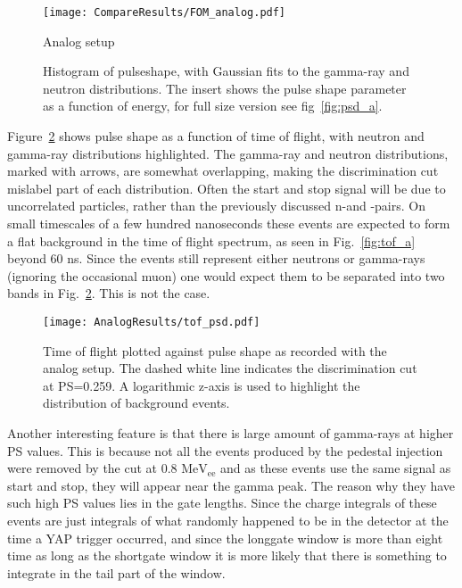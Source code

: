 \documentclass[main.tex]{subfiles}
\begin{document}



\begin{figure}[h!]
	    \centering
    	    \texttt{[image: CompareResults/FOM\_analog.pdf]}
        	\caption{Analog setup}
	    \label{fig:fom_analog} 
    \caption[Histograms of PS, with Gaussian fits for the analog setup.]{Histogram of pulseshape, with Gaussian fits to the gamma-ray and neutron distributions. The insert shows the pulse shape parameter as a function of energy, for full size version see fig~\ref{fig:psd_a}.}
\end{figure}

Figure~\ref{fig:tof_ps_a} shows pulse shape as a function of time of flight, with neutron and gamma-ray distributions highlighted. The gamma-ray and neutron distributions, marked with arrows, are somewhat overlapping, making the discrimination cut mislabel part of each distribution. Often the start and stop signal will be due to uncorrelated particles, rather than the previously discussed n-\textgamma and \textgamma-\textgamma pairs. On small timescales of a few hundred nanoseconds these events are expected to form a flat background in the time of flight spectrum, as seen in Fig.~\ref{fig:tof_a} beyond 60 ns. Since the events still represent either neutrons or gamma-rays (ignoring the occasional muon) one would expect them to be separated into two bands in Fig.~\ref{fig:tof_ps_a}. This is not the case.

\begin{figure}[ht]
    \centering
        \texttt{[image: AnalogResults/tof\_psd.pdf]}
        \caption[Heat map of pulse shape as a function of time of flight.]{Time of flight plotted against pulse shape as recorded with the analog setup. The dashed white line indicates the discrimination cut at PS=0.259. A logarithmic z-axis is used to highlight the distribution of background events.}
    \label{fig:tof_ps_a} 
\end{figure}




Another interesting feature is that there is large amount of gamma-rays at higher PS values. This is because not all the events produced by the pedestal injection were removed by the cut at 0.8 $\text{MeV}_\text{ee}$ and as these events use the same signal as start and stop, they will appear near the gamma peak. The reason why they have such high PS values lies in the gate lengths. Since the charge integrals of these events are just integrals of what randomly happened to be in the detector at the time a YAP trigger occurred, and since the longgate window is more than eight time as long as the shortgate window it is more likely that there is something to integrate in the tail part of the window.
\end{document}
